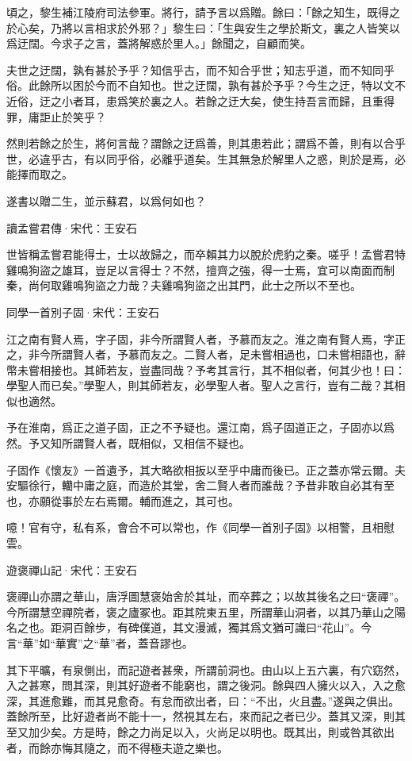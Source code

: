 \documentclass[12pt,a4paper]{ctexbook}
\begin{document}
頃之，黎生補江陵府司法參軍。將行，請予言以爲贈。餘曰：「餘之知生，既得之於心矣，乃將以言相求於外邪？」黎生曰：「生與安生之學於斯文，裏之人皆笑以爲迂闊。今求子之言，蓋將解惑於里人。」餘聞之，自顧而笑。\par
夫世之迂闊，孰有甚於予乎？知信乎古，而不知合乎世；知志乎道，而不知同乎俗。此餘所以困於今而不自知也。世之迂闊，孰有甚於予乎？今生之迂，特以文不近俗，迂之小者耳，患爲笑於裏之人。若餘之迂大矣，使生持吾言而歸，且重得罪，庸詎止於笑乎？\par
然則若餘之於生，將何言哉？謂餘之迂爲善，則其患若此；謂爲不善，則有以合乎世，必違乎古，有以同乎俗，必離乎道矣。生其無急於解里人之惑，則於是焉，必能擇而取之。\par
遂書以贈二生，並示蘇君，以爲何如也？\par
讀孟嘗君傳·宋代：王安石 \par
世皆稱孟嘗君能得士，士以故歸之，而卒賴其力以脫於虎豹之秦。嗟乎！孟嘗君特雞鳴狗盜之雄耳，豈足以言得士？不然，擅齊之強，得一士焉，宜可以南面而制秦，尚何取雞鳴狗盜之力哉？夫雞鳴狗盜之出其門，此士之所以不至也。\par
同學一首別子固·宋代：王安石 \par
江之南有賢人焉，字子固，非今所謂賢人者，予慕而友之。淮之南有賢人焉，字正之，非今所謂賢人者，予慕而友之。二賢人者，足未嘗相過也，口未嘗相語也，辭幣未嘗相接也。其師若友，豈盡同哉？予考其言行，其不相似者，何其少也！曰：學聖人而已矣。”學聖人，則其師若友，必學聖人者。聖人之言行，豈有二哉？其相似也適然。\par
予在淮南，爲正之道子固，正之不予疑也。還江南，爲子固道正之，子固亦以爲然。予又知所謂賢人者，既相似，又相信不疑也。\par
子固作《懷友》一首遺予，其大略欲相扳以至乎中庸而後已。正之蓋亦常云爾。夫安驅徐行，轥中庸之庭，而造於其堂，舍二賢人者而誰哉？予昔非敢自必其有至也，亦願從事於左右焉爾。輔而進之，其可也。\par
噫！官有守，私有系，會合不可以常也，作《同學一首別子固》以相警，且相慰雲。\par
遊褒禪山記·宋代：王安石 \par
褒禪山亦謂之華山，唐浮圖慧褒始舍於其址，而卒葬之；以故其後名之曰“褒禪”。今所謂慧空禪院者，褒之廬冢也。距其院東五里，所謂華山洞者，以其乃華山之陽名之也。距洞百餘步，有碑僕道，其文漫滅，獨其爲文猶可識曰“花山”。今言“華”如“華實”之“華”者，蓋音謬也。\par
其下平曠，有泉側出，而記遊者甚衆，所謂前洞也。由山以上五六裏，有穴窈然，入之甚寒，問其深，則其好遊者不能窮也，謂之後洞。餘與四人擁火以入，入之愈深，其進愈難，而其見愈奇。有怠而欲出者，曰：“不出，火且盡。”遂與之俱出。蓋餘所至，比好遊者尚不能十一，然視其左右，來而記之者已少。蓋其又深，則其至又加少矣。方是時，餘之力尚足以入，火尚足以明也。既其出，則或咎其欲出者，而餘亦悔其隨之，而不得極夫遊之樂也。\par
\end{document}
